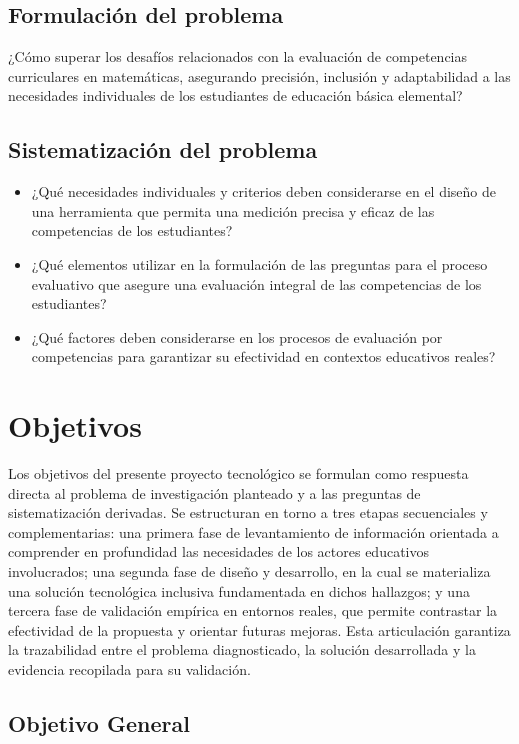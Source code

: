 \subsection{Formulación del problema}

¿Cómo superar los desafíos relacionados con la evaluación de competencias curriculares en matemáticas, asegurando precisión, inclusión y adaptabilidad a las necesidades individuales de los estudiantes de educación básica elemental?

\subsection{Sistematización del problema}

\begin{itemize}[leftmargin=*]
  \item ¿Qué necesidades individuales y criterios deben considerarse en el diseño de una herramienta que permita una medición precisa y eficaz de las competencias de los estudiantes?
  \item ¿Qué elementos utilizar en la formulación de las preguntas para el proceso evaluativo que asegure una evaluación integral de las competencias de los estudiantes?
  \item ¿Qué factores deben considerarse en los procesos de evaluación por competencias para garantizar su efectividad en contextos educativos reales?
\end{itemize}

\section{Objetivos}
\label{sec:objetivos}
Los objetivos del presente proyecto tecnológico se formulan como respuesta directa al problema de investigación planteado y a las preguntas de sistematización derivadas. Se estructuran en torno a tres etapas secuenciales y complementarias: una primera fase de levantamiento de información orientada a comprender en profundidad las necesidades de los actores educativos involucrados; una segunda fase de diseño y desarrollo, en la cual se materializa una solución tecnológica inclusiva fundamentada en dichos hallazgos; y una tercera fase de validación empírica en entornos reales, que permite contrastar la efectividad de la propuesta y orientar futuras mejoras. Esta articulación garantiza la trazabilidad entre el problema diagnosticado, la solución desarrollada y la evidencia recopilada para su validación.

\subsection{Objetivo General}


